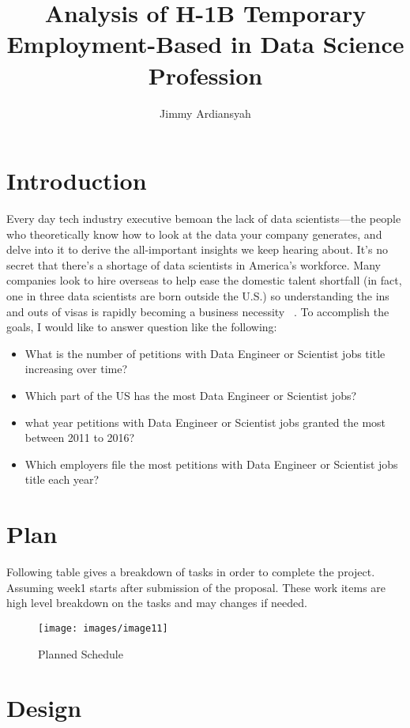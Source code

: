 \documentclass[9pt,twocolumn,twoside]{styles/osajnl}
\title{Analysis of H-1B Temporary Employment-Based in Data Science Profession}
\author[1,*]{Jimmy Ardiansyah}
\affil[1]{School of Informatics and Computing, Bloomington, IN 47408, U.S.A.}
\affil[*]{jardians@indiana.edu - S17-IR-2002}
\begin{document}
\maketitle

\section{Introduction}
Every day tech industry executive bemoan the lack of data scientists—the people who theoretically know how to look at the data your company generates, and delve into it to derive the all-important insights we keep hearing about. It’s no secret that there’s a shortage of data scientists in America’s workforce. Many companies look to hire overseas to help ease the domestic talent shortfall (in fact, one in three data scientists are born outside the U.S.) so understanding the ins and outs of visas is rapidly becoming a business necessity  ~\cite{www-hbr}. To accomplish the goals, I would like to answer question
like the following:

\begin{itemize}
  \item What is the number of petitions with Data Engineer or Scientist jobs title increasing over time?
  \item Which part of the US has the most Data Engineer or Scientist  jobs?
  \item what year petitions with Data Engineer or Scientist jobs granted the most between 2011 to 2016?
  \item  Which employers file the most petitions with Data Engineer or Scientist jobs title each year?
\end{itemize}


\section{Plan}
Following table gives a breakdown of tasks in order to complete the project. Assuming week1 starts after submission of the proposal. These work items are high level breakdown on the tasks and may changes if needed.

\begin{figure}[H]
 \centering
\texttt{[image: images/image11]}
\caption{Planned Schedule}
\end{figure}

\section{Design}
\end{document}
